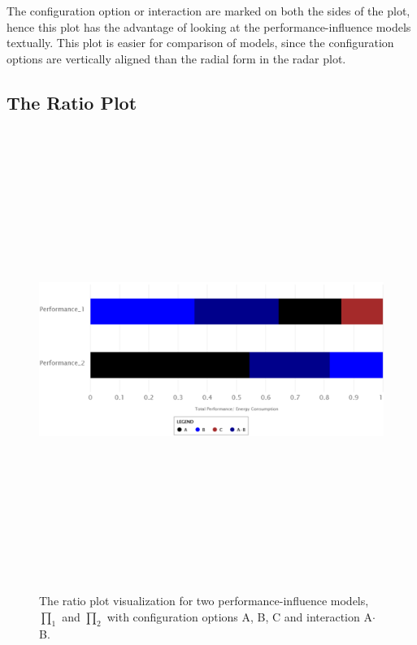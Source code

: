 The configuration option or interaction are marked on both the sides of the plot, hence this plot has the advantage of looking at the performance-influence models textually. This plot is easier for comparison of models, since the configuration options are vertically aligned than the radial form in the radar plot.

\subsection{The Ratio Plot}

\begin{figure}[ht]
    \centering
    \label{ratioPlot}
   \includegraphics[width=15cm,height=15cm,keepaspectratio,]{pics/ratio_plot.pdf}
    \caption[The Ratio Plot]{The ratio plot visualization for two performance-influence models, $\prod_1$ and $\prod_2$ with configuration options A, B, C and interaction A$\cdot$B.}
\end{figure}



